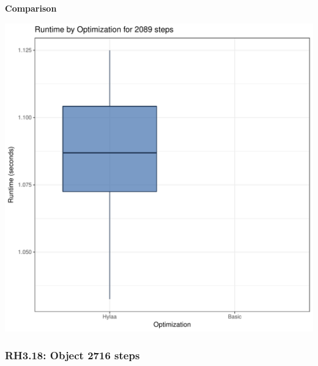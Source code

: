 \documentclass{article}\usepackage[]{graphicx}\usepackage[]{color}
\makeatletter
\def\maxwidth{ %
  \ifdim\Gin@nat@width>\linewidth
    \linewidth
  \else
    \Gin@nat@width
  \fi
}
\newenvironment{knitrout}{}{} %
\makeatother
\begin{document}
 \textbf{Comparison}
  
\begin{knitrout}
\color{fgcolor}
\includegraphics[width=\maxwidth]{figure/RH3_steps2089-1} 

\end{knitrout}


\subsubsection{RH3.18: Object 2716 steps}
\end{document}
